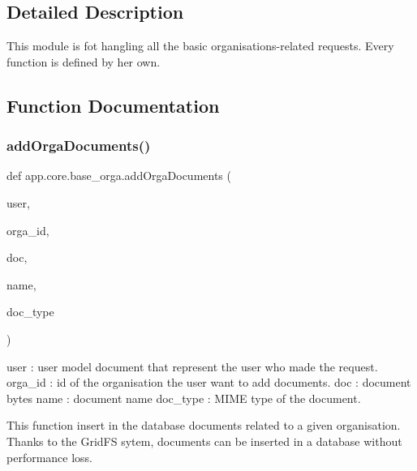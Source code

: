 \subsection{Detailed Description}
\begin{DoxyVerb}This module is fot hangling all the basic organisations-related requests.
Every function is defined by her own.
\end{DoxyVerb}
 

\subsection{Function Documentation}
\mbox{\label{namespaceapp_1_1core_1_1base__orga_aa6e75965aff943ba9256f81c4d18e7bf}} 
\subsubsection{\texorpdfstring{add\+Orga\+Documents()}{addOrgaDocuments()}}
{\footnotesize\ttfamily def app.\+core.\+base\+\_\+orga.\+add\+Orga\+Documents (\begin{DoxyParamCaption}\item[{}]{user,  }\item[{}]{orga\+\_\+id,  }\item[{}]{doc,  }\item[{}]{name,  }\item[{}]{doc\+\_\+type }\end{DoxyParamCaption})}

\begin{DoxyVerb}user : user model document that represent the user who made the request.
orga_id : id of the organisation the user want to add documents.
doc : document bytes
name : document name
doc_type : MIME type of the document.

This function insert in the database documents related to a given organisation.
Thanks to the GridFS sytem, documents can be inserted in a database without performance loss.
\end{DoxyVerb}
 \mbox{\label{namespaceapp_1_1core_1_1base__orga_a389521656081e40b458b98e094339a1a}} 
